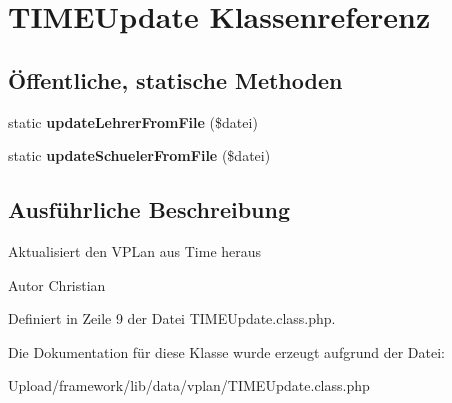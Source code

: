 \hypertarget{class_t_i_m_e_update}{}\section{T\+I\+M\+E\+Update Klassenreferenz}
\label{class_t_i_m_e_update}
\subsection*{Öffentliche, statische Methoden}
\begin{DoxyCompactItemize}
\item 
\mbox{\label{class_t_i_m_e_update_a6b4bdf8b6fe1441f8bb88a1cf18b83ef}} 
static {\bfseries update\+Lehrer\+From\+File} (\$datei)
\item 
\mbox{\label{class_t_i_m_e_update_a4534c94be3fb3844942d3aea4da6eb1f}} 
static {\bfseries update\+Schueler\+From\+File} (\$datei)
\end{DoxyCompactItemize}


\subsection{Ausführliche Beschreibung}
Aktualisiert den V\+P\+Lan aus Time heraus \begin{DoxyAuthor}{Autor}
Christian 
\end{DoxyAuthor}


Definiert in Zeile 9 der Datei T\+I\+M\+E\+Update.\+class.\+php.



Die Dokumentation für diese Klasse wurde erzeugt aufgrund der Datei\+:\begin{DoxyCompactItemize}
\item 
Upload/framework/lib/data/vplan/T\+I\+M\+E\+Update.\+class.\+php\end{DoxyCompactItemize}
